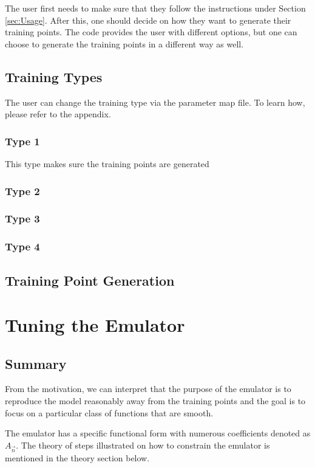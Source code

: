 \documentclass[12pt]{article}
\numberwithin{equation}{section}
\numberwithin{figure}{section}
\begin{document}
The user first needs to make sure that they follow the instructions under Section \ref{sec:Usage}. After this, one should decide on how they want to generate their training points. The code provides the user with different options, but one can choose to generate the training points in a different way as well.

\subsection{Training Types}

The user can change the training type via the parameter map file. To learn how, please refer to the appendix.

\subsubsection{Type 1}

This type makes sure the training points are generated 
\subsubsection{Type 2}
\subsubsection{Type 3}
\subsubsection{Type 4}

\subsection{Training Point Generation}



\section{Tuning the Emulator}

\subsection{Summary}

From the motivation, we can interpret that the purpose of the emulator is to reproduce the model reasonably away from the training points and the goal is to focus on a particular class of functions that are smooth. 

The emulator has a specific functional form with numerous coefficients denoted as $A_{\vec{n}}$. The theory of steps illustrated on how to constrain the emulator is mentioned in the theory section below. 
\end{document}
